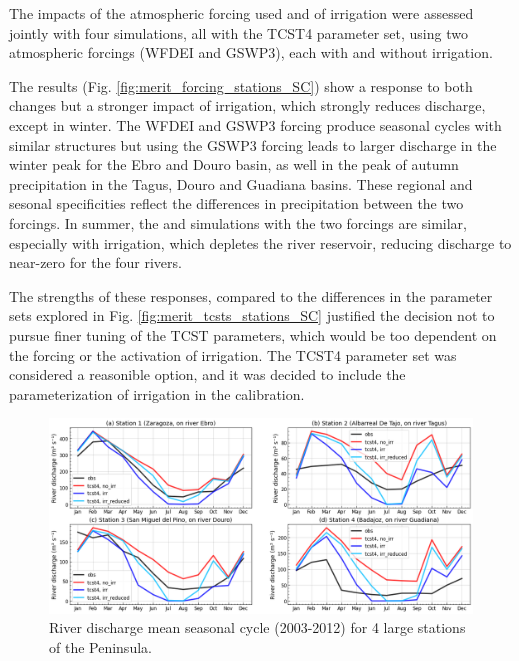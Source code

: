 The impacts of the atmospheric forcing used and of irrigation were assessed jointly with four simulations, all with the TCST4 parameter set, using two atmospheric forcings (WFDEI and GSWP3), %
each with and without irrigation. 

The results (Fig. \ref{fig:merit_forcing_stations_SC}) show a response to both changes but a stronger impact of irrigation, which strongly reduces discharge, except in winter. The WFDEI and GSWP3 forcing produce seasonal cycles with similar structures but using the GSWP3 forcing leads to larger discharge in the winter peak for the Ebro and Douro basin, as well in the peak of autumn precipitation in the Tagus, Douro and Guadiana basins. These regional and sesonal specificities reflect the differences in precipitation between the two forcings. %
In summer, the \noirr and \irr simulations with the two forcings are similar, especially with irrigation, which depletes the river reservoir, reducing discharge to near-zero for the four rivers.

The strengths of these responses, compared to the differences in the parameter sets explored in Fig. \ref{fig:merit_tcsts_stations_SC} justified the decision not to pursue finer tuning of the TCST parameters, which would be too dependent on the forcing or the activation of irrigation. The TCST4 parameter set was considered a reasonible option, and it was decided to include the parameterization of irrigation in the calibration. 

\begin{figure}[htbp]
    \centering
    \includegraphics[width=\linewidth]{images/chap3/river_discharge/merit_irr_4stations_SC.png}
    \caption{River discharge mean seasonal cycle (2003-2012) for 4 large stations of the Peninsula.}
    \label{fig:merit_irr_stations_SC}
\end{figure}

